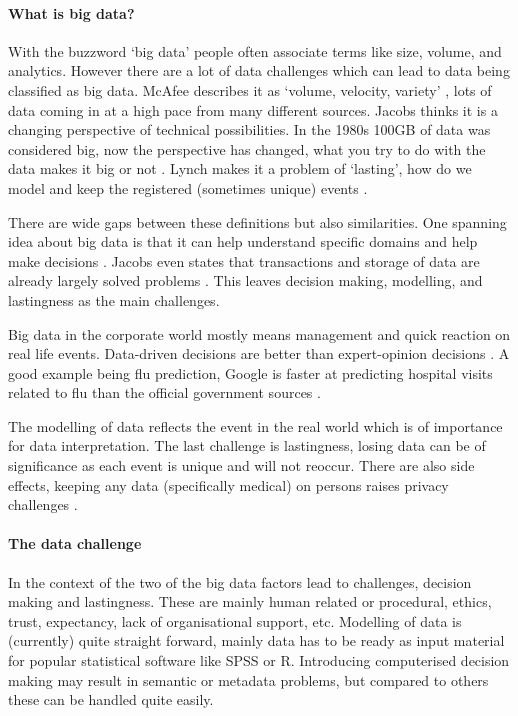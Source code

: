 \paragraph{What is big data?}
With the buzzword `big data' people often associate terms like size, volume, and analytics.
However there are a lot of data challenges which can lead to data being classified as big data.
McAfee describes it as `volume, velocity, variety' \cite{dsb1mcafee}, lots of data coming in at a high pace from many different sources.
Jacobs thinks it is a changing perspective of technical possibilities.
In the 1980s 100GB of data was considered big, now the perspective has changed, what you try to do with the data makes it big or not \cite{dsb5jacobs}.
Lynch makes it a problem of `lasting', how do we model and keep the registered (sometimes unique) events \cite{dsb3lynch}.

There are wide gaps between these definitions but also similarities.
One spanning idea about big data is that it can help understand specific domains and help make decisions \cite{dsb2lohr}.
Jacobs even states that transactions and storage of data are already largely solved problems \cite{dsb5jacobs}.
This leaves decision making, modelling, and lastingness as the main challenges.

Big data in the corporate world mostly means management and quick reaction on real life events.
Data-driven decisions are better than expert-opinion decisions \cite{dsb1mcafee}. 
A good example being flu prediction, Google is faster at predicting hospital visits related to flu than the official government sources \cite{dsb8dugas, dsb1mcafee}.

The modelling of data reflects the event in the real world which is of importance for data interpretation.
The last challenge is lastingness, \eg{} losing data can be of significance as each event is unique and will not reoccur.
There are also side effects, keeping any data (specifically medical) on persons raises privacy challenges \cite{dsb1mcafee}.

\paragraph{The data challenge}
In the context of the \project{} two of the big data factors lead to challenges, decision making and lastingness.
These are mainly human related or procedural, \eg{} ethics, trust, expectancy, lack of organisational support, etc.
Modelling of data is (currently) quite straight forward, mainly data has to be ready as input material for popular statistical software like SPSS or R.
Introducing computerised decision making may result in semantic or metadata problems, but compared to others these can be handled quite easily.

